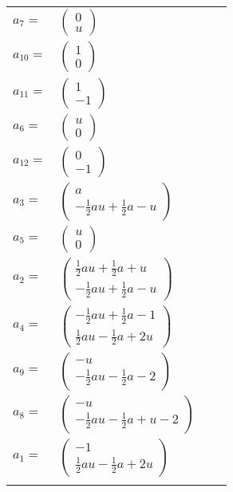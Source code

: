 \documentclass[1p]{elsarticle_modified}
\theoremstyle{definition}
\begin{document}
\begin{tabular}{m{7pt} m{180pt} m{7pt} m{180pt} }
\flushright $a_{7}=$&$\begin{pmatrix}0\\u\end{pmatrix}$ \\
\flushright $a_{10}=$&$\begin{pmatrix}1\\0\end{pmatrix}$ \\
\flushright $a_{11}=$&$\begin{pmatrix}1\\-1\end{pmatrix}$ \\
\flushright $a_{6}=$&$\begin{pmatrix}u\\0\end{pmatrix}$ \\
\flushright $a_{12}=$&$\begin{pmatrix}0\\-1\end{pmatrix}$ \\
\flushright $a_{3}=$&$\begin{pmatrix}a\\-\frac{1}{2} a u+\frac{1}{2} a- u\end{pmatrix}$ \\
\flushright $a_{5}=$&$\begin{pmatrix}u\\0\end{pmatrix}$ \\
\flushright $a_{2}=$&$\begin{pmatrix}\frac{1}{2} a u+\frac{1}{2} a+u\\-\frac{1}{2} a u+\frac{1}{2} a- u\end{pmatrix}$ \\
\flushright $a_{4}=$&$\begin{pmatrix}-\frac{1}{2} a u+\frac{1}{2} a-1\\\frac{1}{2} a u-\frac{1}{2} a+2 u\end{pmatrix}$ \\
\flushright $a_{9}=$&$\begin{pmatrix}- u\\-\frac{1}{2} a u-\frac{1}{2} a-2\end{pmatrix}$ \\
\flushright $a_{8}=$&$\begin{pmatrix}- u\\-\frac{1}{2} a u-\frac{1}{2} a+u-2\end{pmatrix}$ \\
\flushright $a_{1}=$&$\begin{pmatrix}-1\\\frac{1}{2} a u-\frac{1}{2} a+2 u\end{pmatrix}$\\&\end{tabular}
\end{document}
